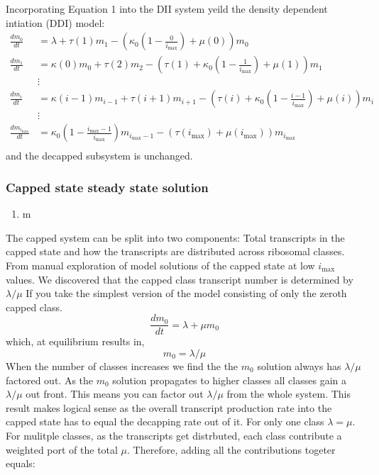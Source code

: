 \documentclass[review]{elsarticle}
\newcommand{\imax}{\ensuremath{{i_{\max}}}\xspace}
\begin{document}
Incorporating Equation 1 into the DII system yeild the density dependent intiation (DDI) model: %
\begin{align*}
\frac{dm_{0}}{dt} &= \lambda+\tau(1)m_{1}-\left(\kappa_0\left(1-\frac{0}{\imax}\right) + \mu(0)\right)m_{0} \\
\frac{dm_{1}}{dt} &= \kappa(0)m_{0}+\tau(2)m_{2}-\left(\tau(1)+\kappa_0\left(1-\frac{1}{\imax}\right)+\mu(1)\right) m_{1}\\
& \vdots & \\
\frac{dm_{i}}{dt} &= \kappa(i-1)m_{i-1}+\tau(i+1)m_{i+1}-\left(\tau(i)+\kappa_0\left(1-\frac{i-1}{\imax}\right)+\mu(i)\right) m_{i} \\
& \vdots & \\
\frac{dm_{\imax}}{dt} &= \kappa_0\left(1-\frac{\imax-1}{\imax}\right)m_{\imax-1}-\left(\tau(\imax)+\mu(\imax)\right) m_{\imax}\\
\end{align*}
and the decapped subsystem is unchanged.

\subsubsection{Capped state steady state solution}
\begin{enumerate}
	\item m


\end{enumerate}






The capped system can be split into two components: Total transcripts in the capped state and how the transcripts are distributed across ribosomal classes. 
From manual exploration of model solutions of the capped state at low \imax values. 
We discovered that the capped class transcript number is determined by $\lambda/ \mu$
If you take the simplest version of the model consisting of only the zeroth capped class.
	\begin{equation} 
		\frac{dm_{0}}{dt} = \lambda + \mu m_{0}
	\end{equation}
which, at equilibrium results in,
	\begin{equation}
		m_{0} = \lambda/\mu
	\end{equation}
When the number of classes increases we find the the $m_{0}$ solution always has $\lambda/ \mu$ factored out. As the $m_{0}$ solution propagates to higher classes all classes gain a $\lambda/ \mu$ out front.
This means you can factor out $\lambda/ \mu$ from the whole system. 
This result makes logical sense as the overall transcript production rate into the capped state has to equal the decapping rate out of it. For only one class $\lambda = \mu$. 
For mulitple classes, as the transcripts get distrbuted, each class contribute a weighted port of the total $\mu$. Therefore, adding all the contributions togeter equals:
\end{document}
